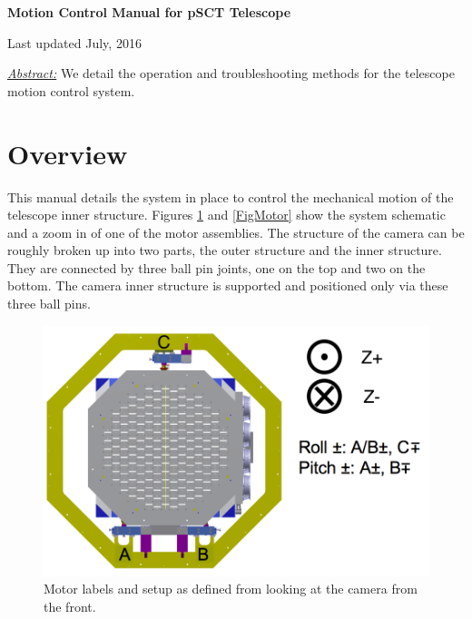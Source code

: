 \documentclass[11pt]{article}
\begin{document}
\begin{center}
{\bf{\huge{Motion Control Manual for pSCT Telescope}}}

\vspace{0.1in}
Last updated July, 2016

\vspace{0.3in}
{\it{\underline{Abstract:}}} We detail the operation and troubleshooting methods for the telescope motion control system.

\end{center}

\tableofcontents

\vspace{0.2in}


\section{Overview}

This manual details the system in place to control the mechanical motion of the telescope inner structure.
Figures \ref{FigWhole} and \ref{FigMotor} show the system schematic and a zoom in of one of the motor assemblies.
The structure of the camera can be roughly broken up into two parts, the outer structure and the inner structure.
They are connected by three ball pin joints, one on the top and two on the bottom.
The camera inner structure is supported and positioned only via these three ball pins.

\begin{figure}[h]
\begin{center}
\includegraphics[width = 4.5in]{camerapicNew.png}
\caption{Motor labels and setup as defined from looking at the camera from the front.}  
\label{FigWhole}
\end{center}
\end{figure}
\end{document}
